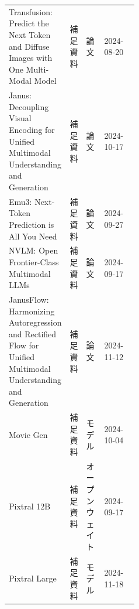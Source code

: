 \begin{center}
\begin{tabularx}{\linewidth}{@{}p{0.20\linewidth}p{0.10\linewidth}p{0.14\linewidth}X@{}}
Transfusion: Predict the Next Token and Diffuse Images with One Multi-Modal Model & 補足資料 & 論文 & 2024-08-20       \\
Janus: Decoupling Visual Encoding for Unified Multimodal Understanding and Generation & 補足資料 & 論文 & 2024-10-17       \\
Emu3: Next-Token Prediction is All You Need & 補足資料 & 論文 & 2024-09-27       \\
NVLM: Open Frontier-Class Multimodal LLMs & 補足資料 & 論文 & 2024-09-17       \\
JanusFlow: Harmonizing Autoregression and Rectified Flow for Unified Multimodal Understanding and Generation & 補足資料 & 論文 & 2024-11-12       \\
Movie Gen & 補足資料 & モデル & 2024-10-04       \\
Pixtral 12B & 補足資料 & オープンウェイト & 2024-09-17       \\
Pixtral Large & 補足資料 & モデル & 2024-11-18       \\
\bottomrule
\end{tabularx}
\end{center}
\normalsize

